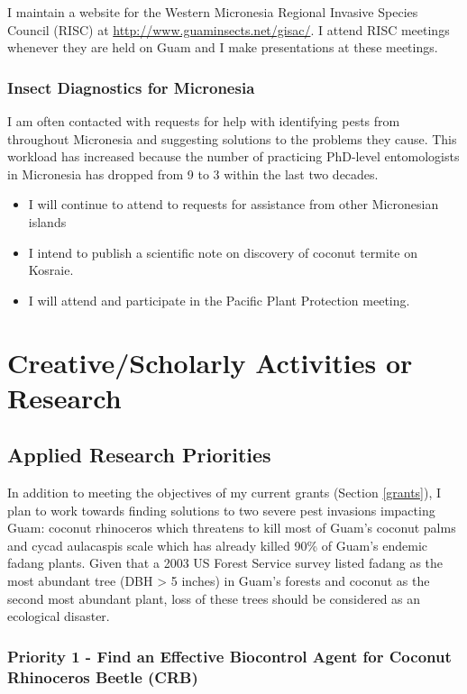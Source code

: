 \documentclass[12pt,oneside,english]{scrbook}
\begin{document}
I maintain a website for the Western Micronesia Regional Invasive
Species Council (RISC) at \url{http://www.guaminsects.net/gisac/}.
I attend RISC meetings whenever they are held on Guam and I make presentations
at these meetings.

\subsection{Insect Diagnostics for Micronesia}

I am often contacted with requests for help with identifying pests
from throughout Micronesia and suggesting solutions to the problems
they cause. This workload has increased because the number
of practicing PhD-level entomologists in Micronesia has dropped from
9 to 3 within the last two decades.

\begin{itemize}
\item I will continue to attend to requests for assistance from other Micronesian islands
\item I intend to publish a scientific note on discovery of coconut termite on Kosraie.
\item I will attend and participate in the Pacific Plant Protection meeting.
\end{itemize}

\pagebreak{}

\chapter{Creative/Scholarly Activities or Research}

\section{Applied Research Priorities}

In addition to meeting the objectives of my current grants (Section \ref{grants}), I plan to work towards finding solutions to two severe pest invasions impacting Guam: coconut rhinoceros which threatens to kill most of Guam's coconut palms and cycad aulacaspis scale which has already killed 90\% of Guam's endemic fadang plants. Given that a 2003 US Forest Service survey listed fadang as the most abundant tree (DBH > 5 inches) in Guam's forests  and coconut as the second most abundant plant, loss of these trees should be considered as an ecological disaster.

\subsection{Priority 1 - Find an Effective Biocontrol Agent for Coconut Rhinoceros Beetle (CRB)}
\label{crb-biocontrol}
\end{document}
